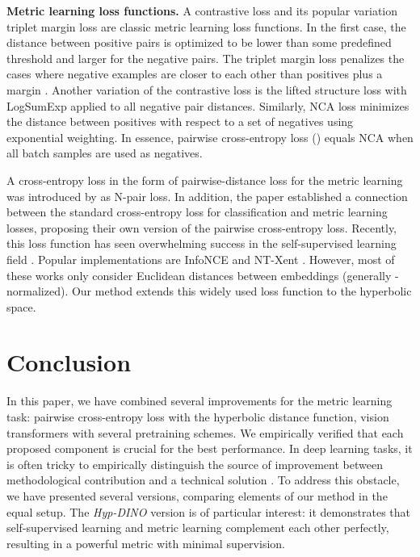 \documentclass[10pt,twocolumn,letterpaper]{article}
\begin{document}
{\bf Metric learning loss functions.}
A contrastive loss \cite{contrastive_2006} and its popular variation triplet margin loss \cite{triplet} are classic metric learning loss functions. In the first case, the distance between positive pairs is optimized to be lower than some predefined threshold and larger for the negative pairs. The triplet margin loss penalizes the cases where negative examples are closer to each other than positives plus a margin . Another variation of the contrastive loss is the lifted structure loss \cite{sop} with LogSumExp applied to all negative pair distances. Similarly, NCA loss \cite{NCA} minimizes the distance between positives with respect to a set of negatives using exponential weighting. In essence, pairwise cross-entropy loss () equals NCA when all batch samples are used as negatives.

A cross-entropy loss in the form of pairwise-distance loss for the metric learning was introduced by \cite{NPair} as N-pair loss. In addition, the paper \cite{boudiaf2020unifying} established a connection between the standard cross-entropy loss for classification and metric learning losses, proposing their own version of the pairwise cross-entropy loss. Recently, this loss function has seen overwhelming success in the self-supervised learning field \cite{CPC,moco,simclr}. Popular implementations are InfoNCE \cite{CPC} and NT-Xent \cite{simclr}. However, most of these works only consider Euclidean distances between embeddings (generally -normalized). Our method extends this widely used loss function to the hyperbolic space.

\section{Conclusion}
\label{sec:conclusion}

In this paper, we have combined several improvements for the metric learning task: pairwise cross-entropy loss with the hyperbolic distance function, vision transformers with several pretraining schemes. We empirically verified that each proposed component is crucial for the best performance.
In deep learning tasks, it is often tricky to empirically distinguish the source of improvement between methodological contribution and a technical solution \cite{reality_check}. To address this obstacle, we have presented several versions, comparing elements of our method in the equal setup. The {\em Hyp-DINO} version is of particular interest: it demonstrates that self-supervised learning and metric learning complement each other perfectly, resulting in a powerful metric with minimal supervision.
\end{document}
